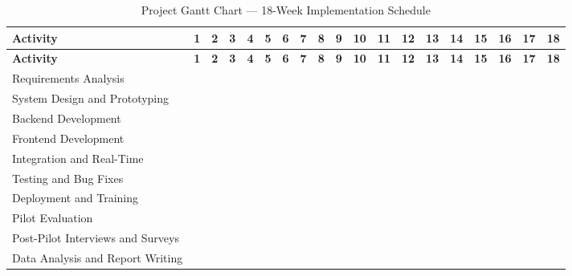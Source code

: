\documentclass[12pt,a4paper]{report}
\begin{document}
\setlength{\tabcolsep}{3pt}
\begin{longtable}{|p{4.3cm}|*{18}{c|}}
\caption{Project Gantt Chart --- 18-Week Implementation Schedule}\\[0.3cm]
\hline
\rowcolor{gray!40}
\textbf{Activity}&\textbf{1}&\textbf{2}&\textbf{3}&\textbf{4}&\textbf{5}&\textbf{6}&\textbf{7}&\textbf{8}&\textbf{9}&\textbf{10}&\textbf{11}&\textbf{12}&\textbf{13}&\textbf{14}&\textbf{15}&\textbf{16}&\textbf{17}&\textbf{18}\\
\hline
\endfirsthead
\hline
\rowcolor{gray!40}
\textbf{Activity}&\textbf{1}&\textbf{2}&\textbf{3}&\textbf{4}&\textbf{5}&\textbf{6}&\textbf{7}&\textbf{8}&\textbf{9}&\textbf{10}&\textbf{11}&\textbf{12}&\textbf{13}&\textbf{14}&\textbf{15}&\textbf{16}&\textbf{17}&\textbf{18}\\
\hline
\endhead
Requirements Analysis&\cellcolor{blue!50}&\cellcolor{blue!50}& & & & & & & & & & & & & & & &\\\hline
System Design and Prototyping&\cellcolor{blue!50}&\cellcolor{blue!50}&\cellcolor{blue!50}& & & & & & & & & & & & & & &\\\hline
Backend Development& &\cellcolor{blue!50}&\cellcolor{blue!50}&\cellcolor{blue!50}&\cellcolor{blue!50}&\cellcolor{blue!50}&\cellcolor{blue!50}&\cellcolor{blue!50}&\cellcolor{blue!50}& & & & & & & & &\\\hline
Frontend Development& & &\cellcolor{blue!50}&\cellcolor{blue!50}&\cellcolor{blue!50}&\cellcolor{blue!50}&\cellcolor{blue!50}&\cellcolor{blue!50}&\cellcolor{blue!50}& & & & & & & & &\\\hline
Integration and Real-Time& & & & & & & & & &\cellcolor{blue!50}&\cellcolor{blue!50}&\cellcolor{blue!50}& & & & & &\\\hline
Testing and Bug Fixes& & & & & & & & & & & & &\cellcolor{blue!50}&\cellcolor{blue!50}&\cellcolor{blue!50}& & &\\\hline
Deployment and Training& & & & & & & & & & & & & & & &\cellcolor{blue!50}& &\\\hline
Pilot Evaluation& & & & & & & & & & & & & & & & &\cellcolor{green!60}&\cellcolor{green!60}\\\hline
Post-Pilot Interviews and Surveys& & & & & & & & & & & & & & & & &\cellcolor{green!60}&\cellcolor{green!60}\\\hline
Data Analysis and Report Writing& & & & & & & & & & & & & & &\cellcolor{gray!50}&\cellcolor{gray!50}&\cellcolor{gray!50}&\cellcolor{gray!50}\\\hline
\end{longtable}
\setlength{\tabcolsep}{6pt}
\restoregeometry
\end{document}
